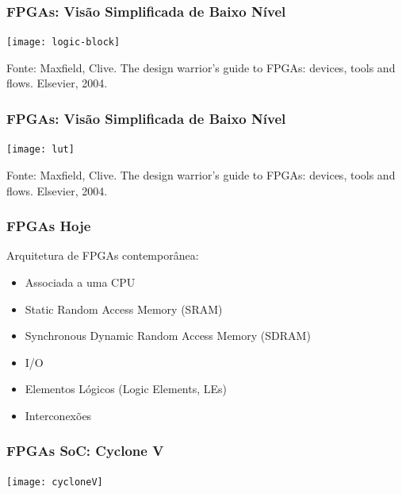\documentclass[10pt, compress]{beamer}
\begin{document}
\begin{frame}
    \frametitle{FPGAs: Visão Simplificada de Baixo Nível}
    \begin{center}
        \texttt{[image: logic-block]}
    \end{center}

    \vfill

    \begin{center}
        \scriptsize{Fonte: Maxfield, Clive. The design warrior's guide to FPGAs: devices, tools and flows. Elsevier, 2004.}
    \end{center}
\end{frame}

\begin{frame}
    \frametitle{FPGAs: Visão Simplificada de Baixo Nível}
    \begin{center}
        \texttt{[image: lut]}
    \end{center}

    \vfill

    \begin{center}
        \scriptsize{Fonte: Maxfield, Clive. The design warrior's guide to FPGAs: devices, tools and flows. Elsevier, 2004.}
    \end{center}
\end{frame}

\begin{frame}
    \frametitle{FPGAs Hoje}
    Arquitetura de FPGAs contemporânea:
    \begin{itemize}
        \item Associada a uma \alert{CPU}
        \item Static Random Access Memory (\alert{SRAM})
        \item Synchronous Dynamic Random Access Memory (\alert{SDRAM})
        \item \alert{I/O}
        \item Elementos Lógicos (Logic Elements, \alert{LEs})
        \item Interconexões
    \end{itemize}
\end{frame}

\begin{frame}
    \frametitle{FPGAs SoC: Cyclone V}
    \begin{center}
        \texttt{[image: cycloneV]}
    \end{center}
\end{frame}
\end{document}
